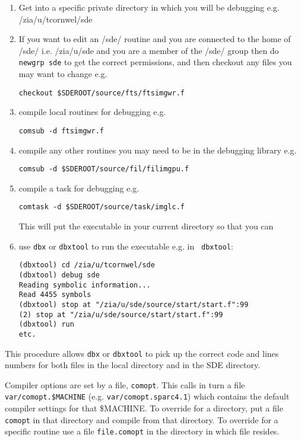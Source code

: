 \begin{enumerate}
\item Get into a specific private directory in which you will be debugging
e.g. /zia/u/tcornwel/sde

\item If you want to edit an /sde/ routine and you are connected to
the home of /sde/ i.e. /zia/u/sde and you are a member of the /sde/
group then do {\tt newgrp sde} to get the correct permissions, and
then checkout any files you may want to change e.g.

{\tt checkout \$SDEROOT/source/fts/ftsimgwr.f}

\item compile local routines for debugging e.g. 

{\tt comsub -d ftsimgwr.f}

\item compile any other routines you may need to be in the debugging library
e.g. 

{\tt comsub -d \$SDEROOT/source/fil/filimgpu.f}

\item compile a task for debugging e.g. 

{\tt comtask -d \$SDEROOT/source/task/imglc.f}

This will put the executable in your current directory so that you can

\item use {\tt dbx} or {\tt dbxtool} to run the executable e.g. in {\tt 
dbxtool}:

\begin{verbatim}
(dbxtool) cd /zia/u/tcornwel/sde
(dbxtool) debug sde
Reading symbolic information...
Read 4455 symbols
(dbxtool) stop at "/zia/u/sde/source/start/start.f":99
(2) stop at "/zia/u/sde/source/start/start.f":99
(dbxtool) run
etc.
\end{verbatim}

\end{enumerate}

This procedure allows {\tt dbx} or {\tt dbxtool} to pick up the
correct code and lines numbers for both files in the local directory
and in the SDE directory.

Compiler options are set by a file, {\tt comopt}. This calls in turn a
file {\tt var/comopt.\$MACHINE} (e.g. {\tt var/comopt.sparc4.1}) which
contains the default compiler settings for that \$MACHINE. To override
for a directory, put a file {\tt comopt} in that directory and compile
from that directory. To override for a specific routine use a file
{\tt file.comopt} in the directory in which file resides.

